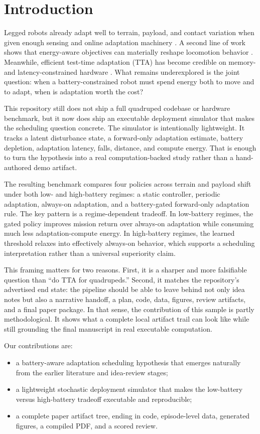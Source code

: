 \section{Introduction}

Legged robots already adapt well to terrain, payload, and contact variation when given enough sensing and online adaptation machinery \citep{kumar2021rma}. A second line of work shows that energy-aware objectives can materially reshape locomotion behavior \citep{fu2021gaits,aboufazeli2023online}. Meanwhile, efficient test-time adaptation (TTA) has become credible on memory- and latency-constrained hardware \citep{hong2023mecta,jia2024tinytta,xiao2026architecture}. What remains underexplored is the joint question: when a battery-constrained robot must spend energy both to move and to adapt, when is adaptation worth the cost?

This repository still does not ship a full quadruped codebase or hardware benchmark, but it now does ship an executable deployment simulator that makes the scheduling question concrete. The simulator is intentionally lightweight. It tracks a latent disturbance state, a forward-only adaptation estimate, battery depletion, adaptation latency, falls, distance, and compute energy. That is enough to turn the hypothesis into a real computation-backed study rather than a hand-authored demo artifact.

The resulting benchmark compares four policies across terrain and payload shift under both low- and high-battery regimes: a static controller, periodic adaptation, always-on adaptation, and a battery-gated forward-only adaptation rule. The key pattern is a regime-dependent tradeoff. In low-battery regimes, the gated policy improves mission return over always-on adaptation while consuming much less adaptation-compute energy. In high-battery regimes, the learned threshold relaxes into effectively always-on behavior, which supports a scheduling interpretation rather than a universal superiority claim.

This framing matters for two reasons. First, it is a sharper and more falsifiable question than ``do TTA for quadrupeds.'' Second, it matches the repository's advertised end state: the pipeline should be able to leave behind not only idea notes but also a narrative handoff, a plan, code, data, figures, review artifacts, and a final paper package. In that sense, the contribution of this sample is partly methodological. It shows what a complete local artifact trail can look like while still grounding the final manuscript in real executable computation.

Our contributions are:
\begin{itemize}
\item a battery-aware adaptation scheduling hypothesis that emerges naturally from the earlier literature and idea-review stages;
\item a lightweight stochastic deployment simulator that makes the low-battery versus high-battery tradeoff executable and reproducible;
\item a complete paper artifact tree, ending in code, episode-level data, generated figures, a compiled PDF, and a scored review.
\end{itemize}
